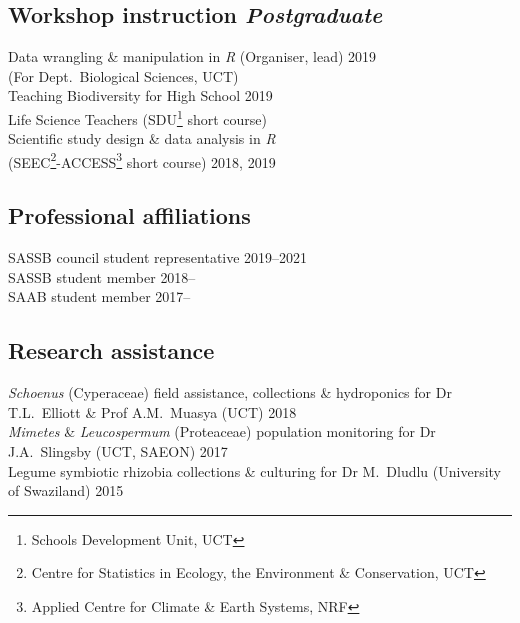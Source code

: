 \documentclass[10pt]{article}
\begin{document}
\begin{multicols}{2}
\subsection*{Workshop instruction %
                                 \hfill {\small \textmd{\textit{Postgraduate}}}}

Data wrangling \& manipulation in \textit{R}
  {\small (Organiser, lead)}                       \hfill {\small       2019} \\
  \hspace{2em} {\small (For Dept.~Biological Sciences, UCT)}                  \\
Teaching Biodiversity for High School              \hfill {\small       2019} \\
  \hspace{2em} Life Science Teachers {\small (SDU\footnote{
    Schools Development Unit, UCT} short course)}                             \\
Scientific study design \& data analysis in \textit{R}                        \\
  \hspace{2em} {\small(SEEC\footnote{Centre for Statistics in
  Ecology, the Environment \&
  Conservation, UCT}-ACCESS\footnote{Applied
  Centre for Climate \& Earth Systems, NRF}
  short course)}                                   \hfill {\small 2018, 2019}

\subsection*{Professional affiliations} %

SASSB council student representative   \hfill {\small 2019--2021            } \\
SASSB student member                   \hfill {\small 2018--\hspace*{2.25em}} \\
SAAB student member                    \hfill {\small 2017--\hspace*{2.25em}}

\end{multicols} %

\subsection*{Research assistance} %

\textit{Schoenus} (Cyperaceae)
  field assistance, collections \& hydroponics
  for Dr T.L.~Elliott \& Prof A.M.~Muasya
  {\small (UCT)}                                         \hfill {\small 2018} \\
\textit{Mimetes} \& \textit{Leucospermum} (Proteaceae)
  population monitoring
  for Dr J.A.~Slingsby
  {\small (UCT, SAEON)}                                  \hfill {\small 2017} \\
Legume symbiotic rhizobia
  collections \& culturing
  for Dr M.~Dludlu
  {\small (University of Swaziland)}                     \hfill {\small 2015}
\end{document}
